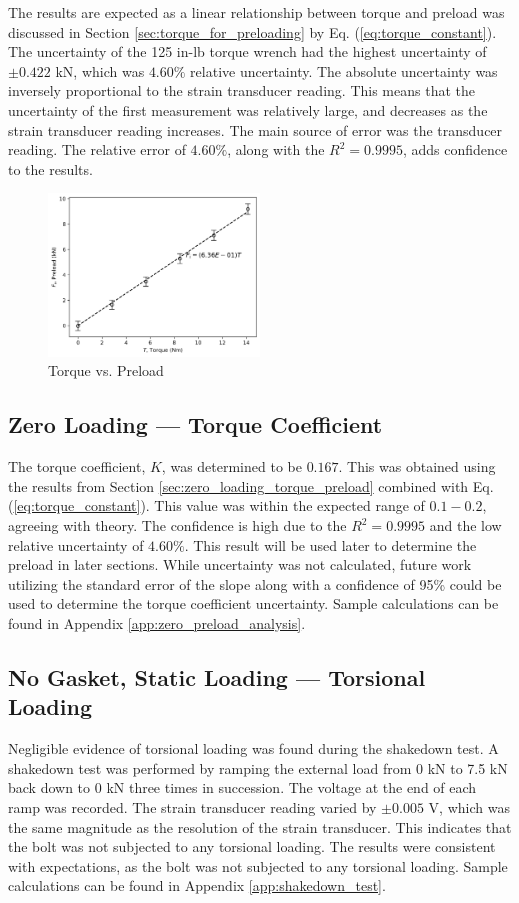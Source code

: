 The results are expected as a linear relationship between torque and preload was discussed in Section \ref{sec:torque_for_preloading} by Eq. (\ref{eq:torque_constant}). The uncertainty of the 125 in-lb torque wrench had the highest uncertainty of $\pm 0.422$ kN, which was $4.60\%$ relative uncertainty. The absolute uncertainty was inversely proportional to the strain transducer reading. This means that the uncertainty of the first measurement was relatively large, and decreases as the strain transducer reading increases. The main source of error was the transducer reading. The relative error of $4.60\%$, along with the $R^2 = 0.9995$, adds confidence to the results. 
\begin{figure}[h]
    \centering
    \includegraphics[width=0.5\textwidth]{Sections/Figures/torque_vs_preload.png}
    \caption{Torque vs. Preload}
    \label{fig:torque_vs_preload}
\end{figure}

\subsection{Zero Loading --- Torque Coefficient}
The torque coefficient, $K$, was determined to be $0.167$. This was obtained using the results from Section \ref{sec:zero_loading_torque_preload} combined with Eq. (\ref{eq:torque_constant}). This value was within the expected range of $0.1 - 0.2$, agreeing with theory. The confidence is high due to the $R^2 = 0.9995$ and the low relative uncertainty of $4.60\%$. This result will be used later to determine the preload in later sections. While uncertainty was not calculated, future work utilizing the standard error of the slope along with a confidence of 95\% could be used to determine the torque coefficient uncertainty. Sample calculations can be found in Appendix \ref{app:zero_preload_analysis}.

\subsection{No Gasket, Static Loading --- Torsional Loading}
Negligible evidence of torsional loading was found during the shakedown test. A shakedown test was performed by ramping the external load from 0 kN to 7.5 kN back down to 0 kN three times in succession. The voltage at the end of each ramp was recorded. The strain transducer reading varied by $\pm 0.005$ V, which was the same magnitude as the resolution of the strain transducer. This indicates that the bolt was not subjected to any torsional loading. The results were consistent with expectations, as the bolt was not subjected to any torsional loading. Sample calculations can be found in Appendix \ref{app:shakedown_test}.

